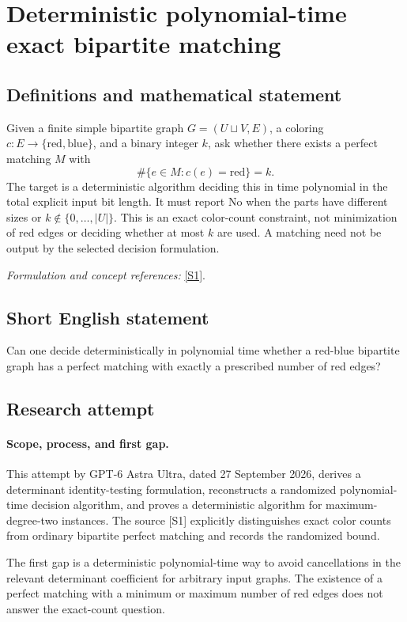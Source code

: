 \documentclass[11pt]{article}
\begin{document}
\section*{\texorpdfstring{Deterministic polynomial-time exact bipartite matching}{Deterministic polynomial-time exact bipartite matching}}\label{30006839}
\subsection{Definitions and mathematical statement}
Given a finite simple bipartite graph $G=(U\sqcup V,E)$, a coloring $c:E\to\{\mathrm{red},\mathrm{blue}\}$, and a binary integer $k$, ask whether there exists a perfect matching $M$ with
\[
 \#\{e\in M:c(e)=\mathrm{red}\}=k.
\]
The target is a deterministic algorithm deciding this in time polynomial in the total explicit input bit length. It must report No when the parts have different sizes or $k\notin\{0,\ldots,|U|\}$. This is an exact color-count constraint, not minimization of red edges or deciding whether at most $k$ are used. A matching need not be output by the selected decision formulation.
\par\smallskip\textit{Formulation and concept references:} \href{https://a3nm.net/work/research/questions/}{[S1]}.

\subsection{Short English statement}
Can one decide deterministically in polynomial time whether a red-blue bipartite graph has a perfect matching with exactly a prescribed number of red edges?
\subsection{Research attempt}
\paragraph{Scope, process, and first gap.}
This attempt by GPT-6 Astra Ultra, dated 27 September 2026, derives a determinant identity-testing formulation, reconstructs a randomized polynomial-time decision algorithm, and proves a deterministic algorithm for maximum-degree-two instances. The source [S1] explicitly distinguishes exact color counts from ordinary bipartite perfect matching and records the randomized bound.

The first gap is a deterministic polynomial-time way to avoid cancellations in the relevant determinant coefficient for arbitrary input graphs. The existence of a perfect matching with a minimum or maximum number of red edges does not answer the exact-count question.
\end{document}
